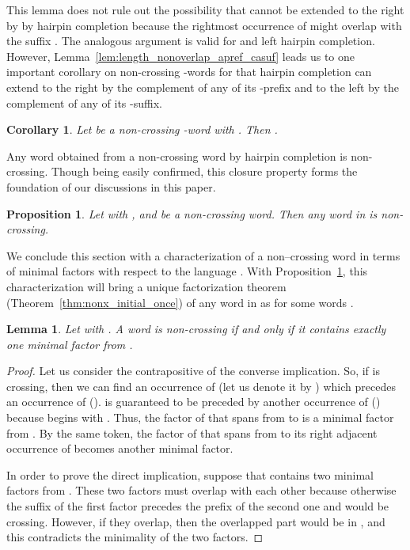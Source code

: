 \documentclass{article}
\theoremstyle{plain}
\newtheorem{lemma}{Lemma}
\newtheorem{proposition}{Proposition}
\newtheorem{corollary}{Corollary}
\theoremstyle{remark}
\begin{document}
This lemma does not rule out the possibility that  cannot be extended to the right by  by hairpin completion because the rightmost occurrence of  might overlap with the suffix . 
The analogous argument is valid for  and left hairpin completion. 
However, Lemma~\ref{lem:length_nonoverlap_apref_casuf} leads us to one important corollary on non-crossing -words for  that hairpin completion can extend  to the right by the complement of any of its -prefix and to the left by the complement of any of its -suffix. 

\begin{corollary}\label{cor:1st_step_mn_ge2}
	Let  be a non-crossing -word with . 
	Then . 
\end{corollary}

Any word obtained from a non-crossing word by hairpin completion is non-crossing. 
Though being easily confirmed, this closure property forms the foundation of our discussions in this paper. 

\begin{proposition}\label{prop:nonx_HC}
	Let  with , and  be a non-crossing word. 
	Then any word in  is non-crossing. 
\end{proposition}

We conclude this section with a characterization of a non--crossing word in terms of minimal factors with respect to the language . 
With Proposition~\ref{prop:nonx_HC}, this characterization will bring a unique factorization theorem (Theorem~\ref{thm:nonx_initial_once}) of any word  in  as  for some words . 

\begin{lemma}
	Let  with . 
	A word  is non-crossing if and only if it contains exactly one minimal factor  from .
\end{lemma}
\begin{proof}
	Let us consider the contrapositive of the converse implication. 
	So, if  is crossing, then we can find an occurrence of  (let us denote it by ) which precedes an occurrence of  (). 
	 is guaranteed to be preceded by another occurrence of  () because  begins with . 
	Thus, the factor of  that spans from  to  is a minimal factor from . 
	By the same token, the factor of  that spans from  to its right adjacent occurrence of  becomes another minimal factor. 

	In order to prove the direct implication, suppose that  contains two minimal factors from . 
	These two factors must overlap with each other because otherwise the suffix  of the first factor precedes the prefix  of the second one and  would be crossing. 
	However, if they overlap, then the overlapped part would be in , and this contradicts the minimality of the two factors. 
\end{proof}
\end{document}

